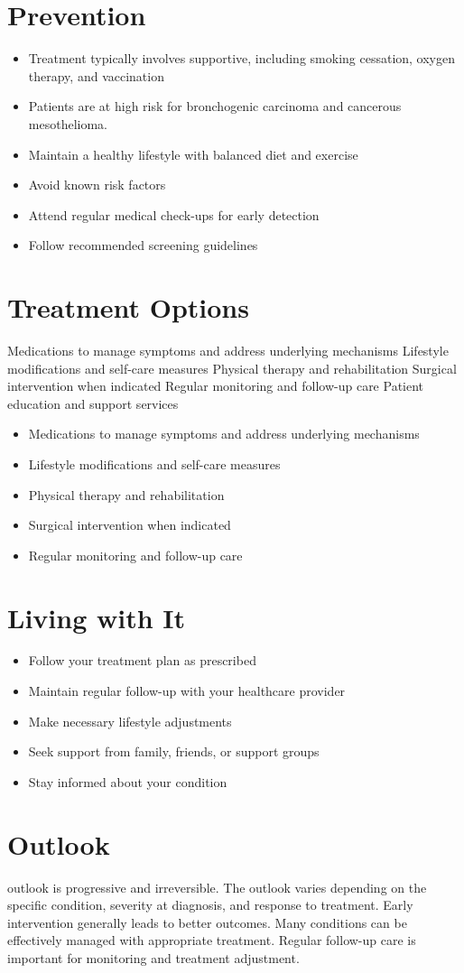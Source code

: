 \section{Prevention}
\begin{itemize}[noitemsep]
  \item Treatment typically involves supportive, including smoking cessation, oxygen therapy, and vaccination
  \item Patients are at high risk for bronchogenic carcinoma and cancerous mesothelioma.
  \item Maintain a healthy lifestyle with balanced diet and exercise
  \item Avoid known risk factors
  \item Attend regular medical check-ups for early detection
  \item Follow recommended screening guidelines
\end{itemize}
\section{Treatment Options}
Medications to manage symptoms and address underlying mechanisms Lifestyle modifications and self-care measures Physical therapy and rehabilitation Surgical intervention when indicated Regular monitoring and follow-up care Patient education and support services

\begin{itemize}[noitemsep]
  \item Medications to manage symptoms and address underlying mechanisms
  \item Lifestyle modifications and self-care measures
  \item Physical therapy and rehabilitation
  \item Surgical intervention when indicated
  \item Regular monitoring and follow-up care
\end{itemize}
\section{Living with It}
\begin{itemize}[noitemsep]
  \item Follow your treatment plan as prescribed
  \item Maintain regular follow-up with your healthcare provider
  \item Make necessary lifestyle adjustments
  \item Seek support from family, friends, or support groups
  \item Stay informed about your condition
\end{itemize}
\section{Outlook}
outlook is progressive and irreversible. The outlook varies depending on the specific condition, severity at diagnosis, and response to treatment. Early intervention generally leads to better outcomes. Many conditions can be effectively managed with appropriate treatment. Regular follow-up care is important for monitoring and treatment adjustment.
